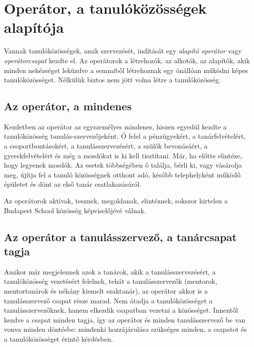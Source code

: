 \hypertarget{operator-a-tanulokozossegek-alapitoja}{%
\section{Operátor, a tanulóközösségek
alapítója}\label{operator-a-tanulokozossegek-alapitoja}}

Vannak tanulóközösségek, amik szervezését, indítását egy \emph{alapító}
\emph{operátor} vagy \emph{operátorcsapat} kezdte el. Az operátorok a
létrehozók, az alkotók, az alapítók, akik minden nehézséget leküzdve a
semmiből létrehoznak egy önállóan működni képes tanulóközösséget.
Nélkülük biztos nem jött volna létre a tanulóközösség.

\hypertarget{az-operator-a-mindenes}{%
\subsection{Az operátor, a mindenes}\label{az-operator-a-mindenes}}

Kezdetben az operátor az egyszemélyes mindenes, hiszen egyedül kezdte a
tanulóközösség tanulás-szervezőjeként. Ő felel a pénzügyekért, a
tanárfelvételért, a csoportbontásokért, a tanulásszervezésért, a szülők
bevonásáért, a gyerekfelvételért és még a mosdókat is ki kell
tisztítani. Már, ha előtte elintéze, hogy legyenek mosdók. Az esetek
többségében ő találja, bérli ki, vagy vásárolja meg, újítja fel a tanuló
közösségnek otthont adó, később telephelyként működő épületet és dönt az
első tanár csatlakozásáról.

Az operátorok aktívak, tesznek, megoldanak, elintéznek, sokszor hirtelen
a Budapest School közösség képviselőjévé válnak.

\hypertarget{az-operator-a-tanulasszervezo-a-tanarcsapat-tagja}{%
\subsection{Az operátor a tanulásszervező, a tanárcsapat
tagja}\label{az-operator-a-tanulasszervezo-a-tanarcsapat-tagja}}

Amikor már megjelennek azok a tanárok, akik a tanulásszervezésért, a
tanulóközösség vezetésért felelnek, tehát a tanulásszervezők (mentorok,
mentortanárok és néhány kiemelt szaktanár), az operátor akkor is a
tanulásszervező csapat része marad. Nem átadja a tanulóközösséget a
tanulásszervezőknek, hanem elkezdik csapatban vezetni a közösséget.
Innentől kezdve a csapat minden tagja, így az operátor és minden
tanulásszervező be van vonva minden döntésbe: mindenki hozzájárulása
szükséges minden, a csapatot és a tanulóközösséget érintő kérdésben.


